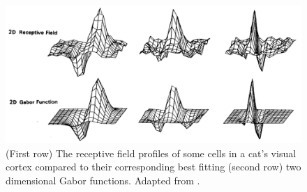 \begin{figure}[t]
        \centering
        \includegraphics[width=1\textwidth]{figures/LitreatureReview/CatReceptiveFields.png}
        \caption[Receptive field profiles of some cells in cats visual cortex]{(First row) The receptive field profiles of some cells in a cat’s visual cortex compared to their corresponding best fitting (second row) two dimensional Gabor functions. Adapted from \cite{Daugman1988}.}
        \label{fig:CatReceptiveField}
\end{figure}



